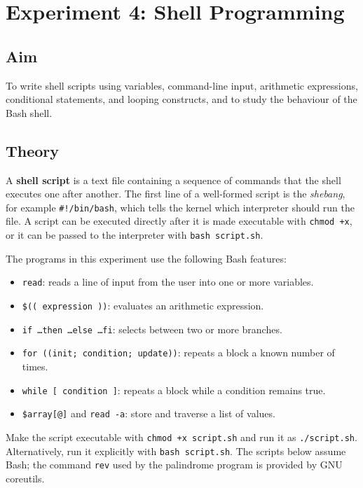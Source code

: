 \section{Experiment 4: Shell Programming}
\label{exp:shell}

\subsection*{Aim}
To write shell scripts using variables, command-line input, arithmetic expressions, conditional statements, and looping constructs, and to study the behaviour of the Bash shell.

\subsection*{Theory}
A \textbf{shell script} is a text file containing a sequence of commands that the shell executes one after another. The first line of a well-formed script is the \emph{shebang}, for example \texttt{\#!/bin/bash}, which tells the kernel which interpreter should run the file. A script can be executed directly after it is made executable with \texttt{chmod +x}, or it can be passed to the interpreter with \texttt{bash script.sh}.

The programs in this experiment use the following Bash features:
\begin{itemize}
    \item \texttt{read}: reads a line of input from the user into one or more variables.
    \item \texttt{\$(( expression ))}: evaluates an arithmetic expression.
    \item \texttt{if \ldots then \ldots else \ldots fi}: selects between two or more branches.
    \item \texttt{for ((init; condition; update))}: repeats a block a known number of times.
    \item \texttt{while [ condition ]}: repeats a block while a condition remains true.
    \item \texttt{\${array[@]}} and \texttt{read -a}: store and traverse a list of values.
\end{itemize}

\begin{infobox}
Make the script executable with \texttt{chmod +x script.sh} and run it as \texttt{./script.sh}. Alternatively, run it explicitly with \texttt{bash script.sh}. The scripts below assume Bash; the command \texttt{rev} used by the palindrome program is provided by GNU coreutils.
\end{infobox}

